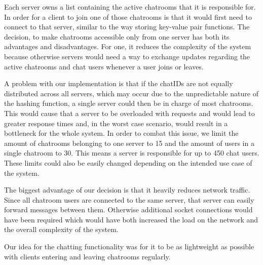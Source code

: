 Each server owns a list containing the active chatrooms that it is responsible for. In order for a client to join one of those chatrooms is that it would first need to connect to that server, similar to the way storing key-value pair functions. The decision, to make chatrooms accessible only from one server has both its advantages and disadvantages. For one, it reduces the complexity of the system because otherwise servers would need a way to exchange updates regarding the active chatrooms and chat users whenever a user joins or leaves.

A problem with our implementation is that if the chatIDs are not equally distributed across all servers, which may occur due to the unpredictable nature of the hashing function, a single server could then be in charge of most chatrooms. This would cause that a server to be overloaded with requests and would lead to greater response times and, in the worst case scenario, would result in a bottleneck for the whole system. In order to combat this issue, we limit the amount of chatrooms belonging to one server to 15 and the amount of users in a single chatroom to 30. This means a server is responsible for up to 450 chat users. These limits could also be easily changed depending on the intended use case of the system.

The biggest advantage of our decision is that it heavily reduces network traffic. Since all chatroom users are connected to the same server, that server can easily forward messages between them. Otherwise additional socket connections would have been required which would have both increased the load on the network and the overall complexity of the system.

Our idea for the chatting functionality was for it to be as lightweight as possible with clients entering and leaving chatrooms regularly.

